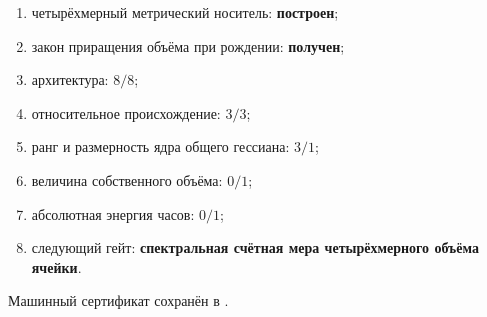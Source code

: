 \begin{protocol}\begin{enumerate}
\item четырёхмерный метрический носитель: \textbf{построен};
\item закон приращения объёма при рождении: \textbf{получен};
\item архитектура: \textbf{$8/8$};
\item относительное происхождение: \textbf{$3/3$};
\item ранг и размерность ядра общего гессиана: \textbf{$3/1$};
\item величина собственного объёма: \textbf{$0/1$};
\item абсолютная энергия часов: \textbf{$0/1$};
\item следующий гейт: \textbf{спектральная счётная мера четырёхмерного
объёма ячейки}.
\end{enumerate}\end{protocol}

Машинный сертификат сохранён в
.